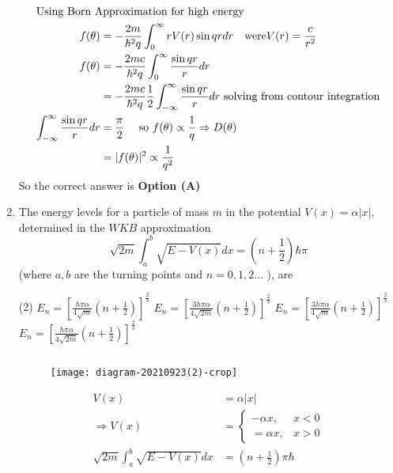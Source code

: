 \begin{enumerate}
\begin{tasks}
\end{tasks}
\begin{answer}
\begin{align*}
\intertext{Using Born Approximation for high energy}
f(\theta)&=-\frac{2 m}{\hbar^{2} q} \int_{0}^{\infty} r V(r) \sin q r d r \quad\text{were} V(r)=\frac{c}{r^{2}}\\
f(\theta)&=-\frac{2 m c}{\hbar^{2} q} \int_{0}^{\infty} \frac{\sin q r}{r} d r\\&=-\frac{2 m c}{\hbar^{2} q} \frac{1}{2} \int_{-\infty}^{\infty} \frac{\sin q r}{r} d r\text{ solving from contour integration}\\
\int_{-\infty}^{\infty} \frac{\sin q r}{r} d r&=\frac{\pi}{2} \quad\text{ so }f(\theta) \propto \frac{1}{q} \Rightarrow D(\theta)\\&=|f(\theta)|^{2} \propto \frac{1}{q^{2}}
\end{align*}
So the correct answer is \textbf{Option (A)}
\end{answer}
\item The energy levels for a particle of mass $m$ in the potential $V(x)=\alpha|x|$, determined in the $W K B$ approximation
$$
\sqrt{2 m} \int_{a}^{b} \sqrt{E-V(x)} d x=\left(n+\frac{1}{2}\right) \hbar \pi
$$
(where $a, b$ are the turning points and $n=0,1,2 \ldots$ ), are
{}
\begin{tasks}(2)
\task[\textbf{A.}] $E_{n}=\left[\frac{h \pi \alpha}{4 \sqrt{m}}\left(n+\frac{1}{2}\right)\right]^{\frac{2}{3}}$
\task[\textbf{B.}] $E_{n}=\left[\frac{3 h \pi \alpha}{4 \sqrt{2 m}}\left(n+\frac{1}{2}\right)\right]^{\frac{2}{3}}$
\task[\textbf{C.}] $E_{n}=\left[\frac{3 h \pi \alpha}{4 \sqrt{m}}\left(n+\frac{1}{2}\right)\right]^{\frac{2}{3}}$
\task[\textbf{D.}] $E_{n}=\left[\frac{h \pi \alpha}{4 \sqrt{2 m}}\left(n+\frac{1}{2}\right)\right]^{\frac{2}{3}}$
\end{tasks}
\begin{answer}$\left. \right. $
\begin{figure}[H]
	\centering
	\texttt{[image: diagram-20210923(2)-crop]}
\end{figure}
\begin{align*}
V(x)&=\alpha|x|\\
\Rightarrow V(x)&=\left\{\begin{array}{ll}-\alpha x, & x<0 \\ =\alpha x, & x>0\end{array}\right.\\
\sqrt{2 m} \int_{a}^{b} \sqrt{E-V(x)} d x&=\left(n+\frac{1}{2}\right) \pi \hbar\\

\end{align*}
\end{answer}
\end{enumerate}
